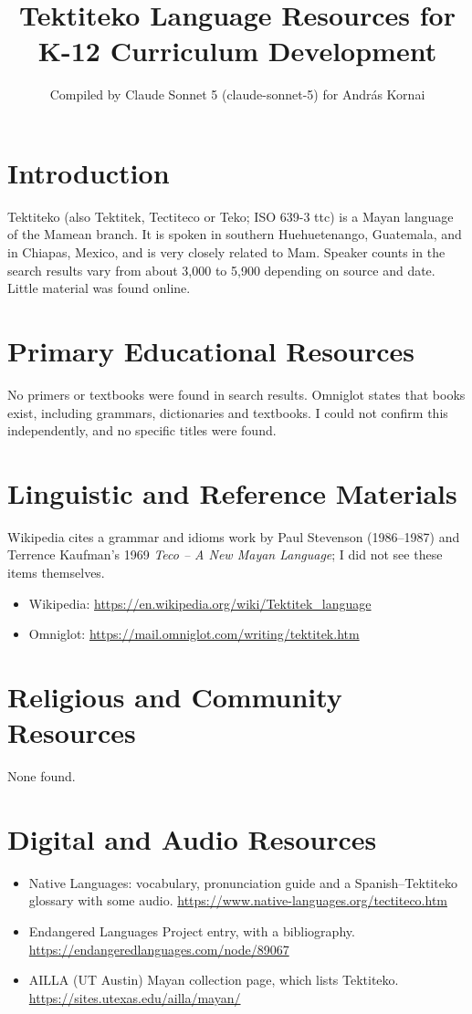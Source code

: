 \documentclass[12pt]{article}
\title{Tektiteko Language Resources for K-12 Curriculum Development}
\author{Compiled by Claude Sonnet 5 (claude-sonnet-5) for Andr\'as Kornai}
\date{}
\begin{document}
\maketitle

\section{Introduction}
Tektiteko (also Tektitek, Tectiteco or Teko; ISO 639-3 ttc) is a Mayan language of the Mamean branch. It is spoken in southern Huehuetenango, Guatemala, and in Chiapas, Mexico, and is very closely related to Mam. Speaker counts in the search results vary from about 3,000 to 5,900 depending on source and date. Little material was found online.

\section{Primary Educational Resources}
No primers or textbooks were found in search results. Omniglot states that books exist, including grammars, dictionaries and textbooks. I could not confirm this independently, and no specific titles were found.

\section{Linguistic and Reference Materials}
Wikipedia cites a grammar and idioms work by Paul Stevenson (1986--1987) and Terrence Kaufman's 1969 \emph{Teco -- A New Mayan Language}; I did not see these items themselves.
\begin{itemize}
\item Wikipedia: \url{https://en.wikipedia.org/wiki/Tektitek_language}
\item Omniglot: \url{https://mail.omniglot.com/writing/tektitek.htm}
\end{itemize}

\section{Religious and Community Resources}
None found.

\section{Digital and Audio Resources}
\begin{itemize}
\item Native Languages: vocabulary, pronunciation guide and a Spanish--Tektiteko glossary with some audio. \url{https://www.native-languages.org/tectiteco.htm}
\item Endangered Languages Project entry, with a bibliography. \url{https://endangeredlanguages.com/node/89067}
\item AILLA (UT Austin) Mayan collection page, which lists Tektiteko. \url{https://sites.utexas.edu/ailla/mayan/}
\end{itemize}
\end{document}
